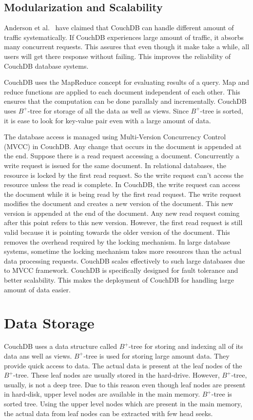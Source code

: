 \documentclass{sig-alternate}
\begin{document}
\subsection{Modularization and Scalability}
\label{modularization and scalability}
Anderson et al.~\cite{Anderson:CouchDB} have claimed that CouchDB can handle different amount of traffic systematically. If CouchDB experiences large amount of traffic, it absorbs many concurrent requests. This assures that even though it make take a while,  all users will get there response without failing. This improves the reliability of CouchDB database systems.

CouchDB uses the MapReduce concept for evaluating results of a query. Map and reduce functions are applied to each document independent of each other. This ensures that the computation can be done parallaly and incrementally. CouchDB uses $B^{+}$-tree for storage of all the data as well as views. Since $B^{+}$-tree is sorted, it is ease to look for key-value pair even with a large amount of data.

The database access is managed using Multi-Version Concurrency Control (MVCC) in CouchDB. Any change that occurs in the document is appended at the end. Suppose there is a read request accessing a document. Concurrently a write request is issued for the same document. In relational databases, the resource is locked by the first read request. So the write request can't access the resource unless the read is complete. In CouchDB, the write request can access the document while it is being read by the first read request. The write request modifies the document and creates a new version of the document. This new version is appended at the end of the document. Any new read request coming after this point refers to this new version. However, the first read request is still valid because it is pointing towards the older version of the document. This removes the overhead required by the locking mechanism. In large database systems, sometime the locking mechanism takes more resources than the actual data processing requests. CouchDB scales effectively to such large databases due to MVCC framework. CouchDB is specifically designed for fault tolerance and better scalability. This makes the deployment of CouchDB for handling large amount of data easier.


\section{Data Storage}
\label{data storage}
CouchDB uses a data structure called $B^+$-tree for storing and indexing all of its data ans well as views. $B^+$-tree is used for storing large amount data. They provide quick access to data. The actual data is present at the leaf nodes of the $B^+$-tree. These leaf nodes are usually stored in the hard-drive. However, $B^+$-tree, usually, is not a deep tree. Due to this reason even though leaf nodes are present in hard-disk, upper level nodes are available in the main memory. $B^+$-tree is sorted tree. Using the upper level nodes which are present in the main memory, the actual data from leaf nodes can be extracted with few head seeks.
\end{document}
